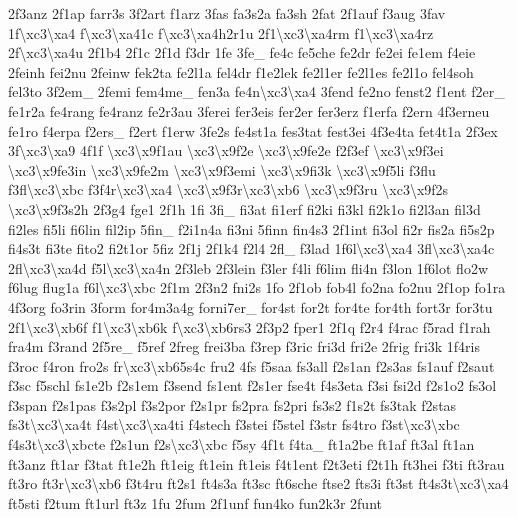 \begin{DoxyCompactItemize}
2f3anz 2f1ap farr3s 3f2art f1arz 3fas fa3s2a fa3sh 2fat 2f1auf f3aug 3fav 1f\textbackslash{}xc3\textbackslash{}xa4 f\textbackslash{}xc3\textbackslash{}xa41c f\textbackslash{}xc3\textbackslash{}xa4h2r1u 2f1\textbackslash{}xc3\textbackslash{}xa4rm f1\textbackslash{}xc3\textbackslash{}xa4rz 2f\textbackslash{}xc3\textbackslash{}xa4u 2f1b4 2f1c 2f1d f3dr 1fe 3fe\-\_\- fe4c fe5che fe2dr fe2ei fe1em f4eie 2feinh fei2nu 2feinw fek2ta fe2l1a fel4dr f1e2lek fe2l1er fe2l1es fe2l1o fel4soh fel3to 3f2em\-\_\- 2femi fem4me\-\_\- fen3a fe4n\textbackslash{}xc3\textbackslash{}xa4 3fend fe2no fenst2 f1ent f2er\-\_\- fe1r2a fe4rang fe4ranz fe2r3au 3ferei fer3eis fer2er fer3erz f1erfa f2ern 4f3erneu fe1ro f4erpa f2ers\-\_\- f2ert f1erw 3fe2s fe4st1a fes3tat fest3ei 4f3e4ta fet4t1a 2f3ex 3f\textbackslash{}xc3\textbackslash{}xa9 4f1f \textbackslash{}xc3\textbackslash{}x9f1au \textbackslash{}xc3\textbackslash{}x9f2e \textbackslash{}xc3\textbackslash{}x9fe2e f2f3ef \textbackslash{}xc3\textbackslash{}x9f3ei \textbackslash{}xc3\textbackslash{}x9fe3in \textbackslash{}xc3\textbackslash{}x9fe2m \textbackslash{}xc3\textbackslash{}x9f3emi \textbackslash{}xc3\textbackslash{}x9fi3k \textbackslash{}xc3\textbackslash{}x9f5li f3flu f3fl\textbackslash{}xc3\textbackslash{}xbc f3f4r\textbackslash{}xc3\textbackslash{}xa4 \textbackslash{}xc3\textbackslash{}x9f3r\textbackslash{}xc3\textbackslash{}xb6 \textbackslash{}xc3\textbackslash{}x9f3ru \textbackslash{}xc3\textbackslash{}x9f2s \textbackslash{}xc3\textbackslash{}x9f3s2h 2f3g4 fge1 2f1h 1fi 3fi\-\_\- fi3at fi1erf fi2ki fi3kl fi2k1o fi2l3an fil3d fi2les fi5li fi6lin fil2ip 5fin\-\_\- f2i1n4a fi3ni 5finn fin4s3 2f1int fi3ol fi2r fis2a fi5s2p fi4s3t fi3te fito2 fi2t1or 5fiz 2f1j 2f1k4 f2l4 2fl\-\_\- f3lad 1f6l\textbackslash{}xc3\textbackslash{}xa4 3fl\textbackslash{}xc3\textbackslash{}xa4c 2fl\textbackslash{}xc3\textbackslash{}xa4d f5l\textbackslash{}xc3\textbackslash{}xa4n 2f3leb 2f3lein f3ler f4li f6lim fli4n f3lon 1f6lot flo2w f6lug flug1a f6l\textbackslash{}xc3\textbackslash{}xbc 2f1m 2f3n2 fni2s 1fo 2f1ob fob4l fo2na fo2nu 2f1op fo1ra 4f3org fo3rin 3form for4m3a4g forni7er\-\_\- for4st for2t for4te for4th fort3r for3tu 2f1\textbackslash{}xc3\textbackslash{}xb6f f1\textbackslash{}xc3\textbackslash{}xb6k f\textbackslash{}xc3\textbackslash{}xb6rs3 2f3p2 fper1 2f1q f2r4 f4rac f5rad f1rah fra4m f3rand 2f5re\-\_\- f5ref 2freg frei3ba f3rep f3ric fri3d fri2e 2frig fri3k 1f4ris f3roc f4ron fro2s fr\textbackslash{}xc3\textbackslash{}xb65s4c fru2 4fs f5saa fs3all f2s1an f2s3as fs1auf f2saut f3sc f5schl fs1e2b f2s1em f3send fs1ent f2s1er fse4t f4s3eta f3si fsi2d f2s1o2 fs3ol f3span f2s1pas f3s2pl f3s2por f2s1pr fs2pra fs2pri fs3s2 f1s2t fs3tak f2stas fs3t\textbackslash{}xc3\textbackslash{}xa4t f4st\textbackslash{}xc3\textbackslash{}xa4ti f4stech f3stei f5stel f3str fs4tro f3st\textbackslash{}xc3\textbackslash{}xbc f4s3t\textbackslash{}xc3\textbackslash{}xbcte f2s1un f2s\textbackslash{}xc3\textbackslash{}xbc f5sy 4f1t f4ta\-\_\- ft1a2be ft1af ft3al ft1an ft3anz ft1ar f3tat ft1e2h ft1eig ft1ein ft1eis f4t1ent f2t3eti f2t1h ft3hei f3ti ft3rau ft3ro ft3r\textbackslash{}xc3\textbackslash{}xb6 f3t4ru ft2s1 ft4s3a ft3sc ft6sche ftse2 fts3i ft3st ft4s3t\textbackslash{}xc3\textbackslash{}xa4 ft5sti f2tum ft1url ft3z 1fu 2fum 2f1unf fun4ko fun2k3r 2funt 
\end{DoxyCompactItemize}
